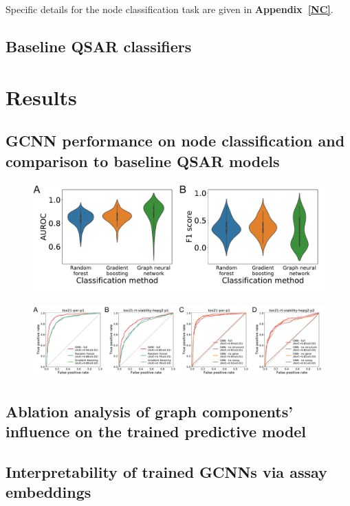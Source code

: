 \documentclass{ws-procs11x85}
\begin{document}
Specific details for the node classification task are given in \textbf{Appendix~\ref{NC}}.

\subsection{Baseline QSAR classifiers}

\section{Results}
\subsection{GCNN performance on node classification and comparison to baseline QSAR models}

\begin{figure}
   \includegraphics[width=\textwidth]{figures/figure2.pdf}
\end{figure}

\begin{figure}
   \includegraphics[width=\textwidth]{figures/figure3.pdf}
\end{figure}

\subsection{Ablation analysis of graph components' influence on the trained predictive model}

\subsection{Interpretability of trained GCNNs via assay embeddings}
\end{document}
